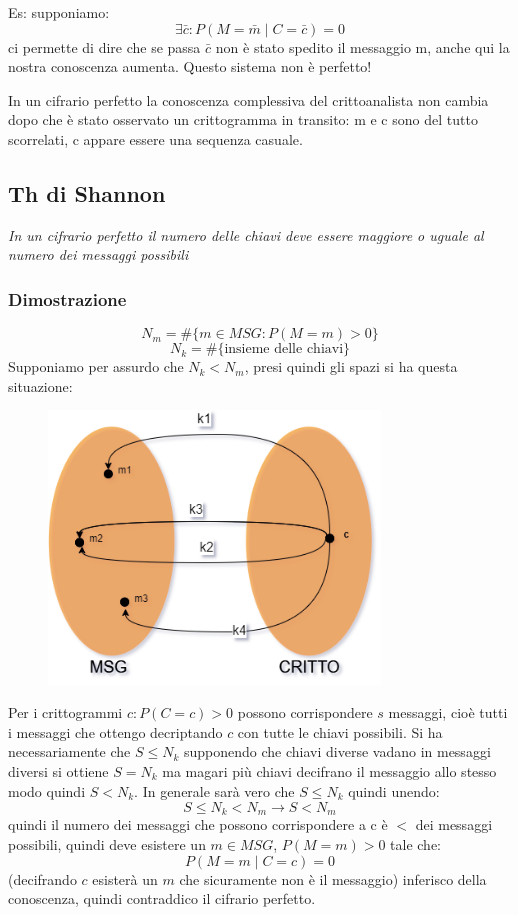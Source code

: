 Es: supponiamo:
$$\exists \bar{c} : P(M=\bar{m} \mid C=\bar{c}) = 0$$
ci permette di dire che se passa $\bar{c}$ non è stato spedito il messaggio m, anche qui la nostra conoscenza aumenta. Questo sistema non è perfetto!

In un cifrario perfetto la conoscenza complessiva del crittoanalista non cambia dopo che è stato osservato un crittogramma in transito: m e c sono del tutto scorrelati, c appare essere una sequenza casuale.

\subsection{Th di Shannon}
\emph{In un cifrario perfetto il numero delle chiavi deve essere maggiore o uguale al numero dei messaggi possibili}
\subsubsection{Dimostrazione}
$$N_m = \#\{m \in MSG : P(M=m)>0\}$$
$$N_k = \#\{\text{insieme delle chiavi}\}$$
Supponiamo per assurdo che $N_k < N_m$, presi quindi gli spazi si ha questa situazione:

\begin{figure}[H]
  \centering
  \includegraphics[width = 250pt]{Shannon_proof.png}
\end{figure}

Per i crittogrammi $c : P(C=c) > 0$ possono corrispondere $s$ messaggi, cioè tutti i messaggi che ottengo decriptando $c$ con tutte le chiavi possibili. Si ha necessariamente che $S \leq N_k$ supponendo che chiavi diverse vadano in messaggi diversi si ottiene $S = N_k$ ma magari più chiavi decifrano il messaggio allo stesso modo quindi $S < N_k$. In generale sarà vero che $S \leq N_k$ quindi unendo:
$$ S \leq N_k < N_m \xrightarrow{} S < N_m $$
quindi il numero dei messaggi che possono corrispondere a c è $<$ dei messaggi possibili, quindi deve esistere un $m \in MSG$, $P(M=m) > 0$ tale che:
$$ P(M=m \mid C=c) = 0 $$
(decifrando $c$ esisterà un $m$ che sicuramente non è il messaggio) inferisco della conoscenza, quindi contraddico il cifrario perfetto.

